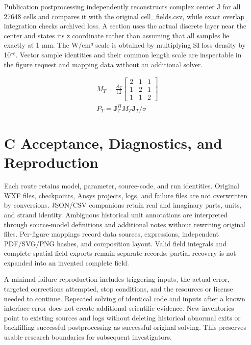 \documentclass[11pt]{article}
\begin{document}
Publication postprocessing independently reconstructs complex center J for all 27648 cells and compares it with the original cell\_fields.csv, while exact overlap integration checks archived loss. A section uses the actual discrete layer near the center and states its z coordinate rather than assuming that all samples lie exactly at 1 mm. The W/cm³ scale is obtained by multiplying SI loss density by 10⁻⁶. Vector sample identities and their common length scale are inspectable in the figure request and mapping data without an additional solver.


\hypertarget{E09}{}
\begin{equation}
\begin{gathered}
M_T=\frac{A_T}{12}\begin{bmatrix}2&1&1\\1&2&1\\1&1&2\end{bmatrix} \\
P_T=\mathbf J_T^H M_T\mathbf J_T/\sigma
\end{gathered}
\tag{9}\label{eq:E09}
\end{equation}
\FloatBarrier
\section*{C Acceptance, Diagnostics, and Reproduction}
\hypertarget{chapter-C}{}
Each route retains model, parameter, source-code, and run identities. Original WXF files, checkpoints, Ansys projects, logs, and failure files are not overwritten by conversions. JSON/CSV companions retain real and imaginary parts, units, and strand identity. Ambiguous historical unit annotations are interpreted through source-model definitions and additional notes without rewriting original files. Per-figure mappings record data sources, expressions, independent PDF/SVG/PNG hashes, and composition layout. Valid field integrals and complete spatial-field exports remain separate records; partial recovery is not expanded into an invented complete field.


A minimal failure reproduction includes triggering inputs, the actual error, targeted corrections attempted, stop conditions, and the resources or license needed to continue. Repeated solving of identical code and inputs after a known interface error does not create additional scientific evidence. New inventories point to existing sources and logs without deleting historical abnormal exits or backfilling successful postprocessing as successful original solving. This preserves usable research boundaries for subsequent investigators.
\end{document}
